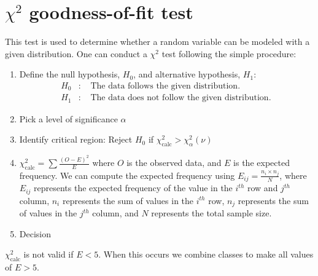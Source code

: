 \section{$\chi^2$ goodness-of-fit test} \label{Section:ChiSquareTest}
This test is used to determine whether a random variable can be modeled with a given distribution. One can conduct a $\chi^2$ test following the simple procedure:
\begin{enumerate}[label = \arabic*)]
	\item Define the null hypothesis, $H_0$, and alternative hypothesis, $H_1$:
	\begin{eqnarray}
		H_0&:& \text{ The data follows the given distribution.} \\
		H_1&:& \text{ The data does not follow the given distribution.} \
	\end{eqnarray}
	\item Pick a level of significance $\alpha$
	\item Identify critical region: Reject $H_0$ if $\chi^2_\text{calc} > \chi^2_\alpha (\nu)$ \
	
	\item $\chi^2_\text{calc} =\sum \frac{(O - E)^2}{E} $
	where $O$ is the observed data, and $E$ is the expected frequency. We can compute the expected frequency using $E_{ij} = \frac{n_i \times n_j}{N}$, where $E_{ij}$ represents the expected frequency of the value in the $i^{th}$ row and $j^{th}$ column, $n_i$ represents the sum of values in the $i^{th}$ row, $n_{j}$ represents the sum of values in the $j^{th}$ column, and $N$ represents the total sample size. 
	\item Decision
\end{enumerate}

\begin{note}
	$\chi^2_\text{calc}$ is not valid if $E < 5$. When this occurs we combine classes to make all values of $E>5$.
\end{note}

